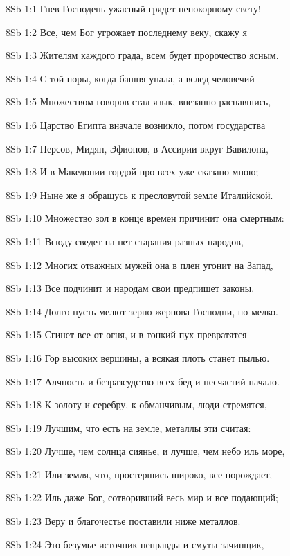 \vs 8Sb 1:1 Гнев Господень ужасный грядет непокорному свету! 

\vs 8Sb 1:2 Все, чем Бог угрожает последнему веку, скажу я 

\vs 8Sb 1:3 Жителям каждого града, всем будет пророчество ясным. 

\vs 8Sb 1:4 С той поры, когда башня упала, а вслед человечий 

\vs 8Sb 1:5 Множеством говоров стал язык, внезапно распавшись, 

\vs 8Sb 1:6 Царство Египта вначале возникло, потом государства 

\vs 8Sb 1:7 Персов, Мидян, Эфиопов, в Ассирии вкруг Вавилона, 

\vs 8Sb 1:8 И в Македонии гордой  про всех уже сказано мною; 

\vs 8Sb 1:9 Ныне же я обращусь к пресловутой земле Италийской.

\vs 8Sb 1:10 Множество зол в конце времен причинит она смертным: 

\vs 8Sb 1:11 Всюду сведет на нет старания разных народов, 

\vs 8Sb 1:12 Многих отважных мужей она в плен угонит на Запад, 

\vs 8Sb 1:13 Все подчинит и народам свои предпишет законы. 

\vs 8Sb 1:14 Долго пусть мелют зерно жернова Господни, но мелко.

\vs 8Sb 1:15 Сгинет все от огня, и в тонкий пух превратятся 

\vs 8Sb 1:16 Гор высоких вершины, а всякая плоть станет пылью. 

\vs 8Sb 1:17 Алчность и безразсудство  всех бед и несчастий начало. 

\vs 8Sb 1:18 К золоту и серебру, к обманчивым, люди стремятся, 

\vs 8Sb 1:19 Лучшим, что есть на земле, металлы эти считая:

\vs 8Sb 1:20 Лучше, чем солнца сиянье, и лучше, чем небо иль море, 

\vs 8Sb 1:21 Или земля, что, простершись широко, все порождает, 

\vs 8Sb 1:22 Иль даже Бог, сотворивший весь мир и все подающий; 

\vs 8Sb 1:23 Веру и благочестье поставили ниже металлов. 

\vs 8Sb 1:24 Это безумье  источник неправды и смуты зачинщик,

